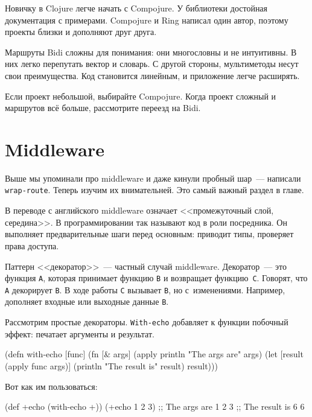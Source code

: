 Новичку в Clojure легче начать с Compojure. У библиотеки достойная документация
с примерами. Compojure и Ring написал один автор, поэтому проекты близки и
дополняют друг друга.

Маршруты Bidi сложны для понимания: они многословны и не интуитивны. В них легко
перепутать вектор и словарь. С другой стороны, мультиметоды несут свои
преимущества. Код становится линейным, и приложение легче расширять.

Если проект небольшой, выбирайте Compojure. Когда проект сложный и маршрутов всё
больше, рассмотрите переезд на Bidi.

\section{Middleware}


Выше мы упоминали про middleware и даже кинули пробный шар~--- написали
\verb|wrap-route|. Теперь изучим их внимательней. Это самый важный раздел в
главе.

В переводе с английского middleware означает <<промежуточный слой, середина>>. В
программировании так называют код в роли посредника. Он выполняет
предварительные шаги перед основным: приводит типы, проверяет права доступа.

\label{decorator}


Паттерн <<декоратор>>~--- частный случай middleware. Декоратор~--- это функция
\verb|А|, которая принимает функцию \verb|B| и возвращает
функцию~\verb|C|. Говорят, что \verb|A| декорирует \verb|B|. В ходе работы
\verb|C| вызывает \verb|B|, но с~изменениями. Например, дополняет входные
или выходные данные \verb|B|.

Рассмотрим простые декораторы. \verb|With-echo| добавляет к функции побочный
эффект: печатает аргументы и результат.

\begin{english}
  \begin{clojure}
(defn with-echo [func]
  (fn [& args]
    (apply println "The args are" args)
    (let [result (apply func args)]
      (println "The result is" result)
      result)))
  \end{clojure}
\end{english}

Вот как им пользоваться:

\begin{english}
  \begin{clojure}
(def +echo (with-echo +))
(+echo 1 2 3)
;; The args are 1 2 3
;; The result is 6
6
  \end{clojure}
\end{english}

